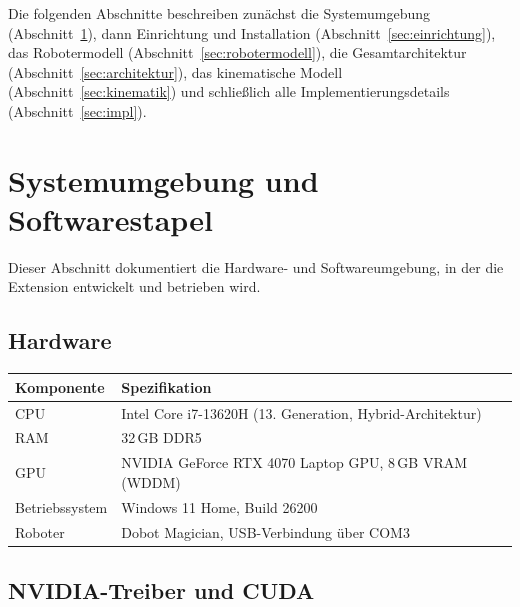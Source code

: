 \documentclass[11pt,a4paper]{article}
\begin{document}
Die folgenden Abschnitte beschreiben zunächst die Systemumgebung
(Abschnitt~\ref{sec:system}), dann Einrichtung und Installation
(Abschnitt~\ref{sec:einrichtung}), das Robotermodell
(Abschnitt~\ref{sec:robotermodell}), die Gesamtarchitektur
(Abschnitt~\ref{sec:architektur}), das kinematische Modell
(Abschnitt~\ref{sec:kinematik}) und schließlich alle
Implementierungsdetails (Abschnitt~\ref{sec:impl}).

\section{Systemumgebung und Softwarestapel}
\label{sec:system}

Dieser Abschnitt dokumentiert die Hardware- und Softwareumgebung,
in der die Extension entwickelt und betrieben wird.

\subsection{Hardware}

\begin{center}
\begin{tabular}{ll}
  \toprule
  Komponente & Spezifikation \\
  \midrule
  CPU & Intel Core i7-13620H (13. Generation, Hybrid-Architektur) \\
  RAM & 32\,GB DDR5 \\
  GPU & NVIDIA GeForce RTX 4070 Laptop GPU, 8\,GB VRAM (WDDM) \\
  Betriebssystem & Windows 11 Home, Build 26200 \\
  Roboter & Dobot Magician, USB-Verbindung über COM3 \\
  \bottomrule
\end{tabular}
\end{center}

\subsection{NVIDIA-Treiber und CUDA}
\end{document}

